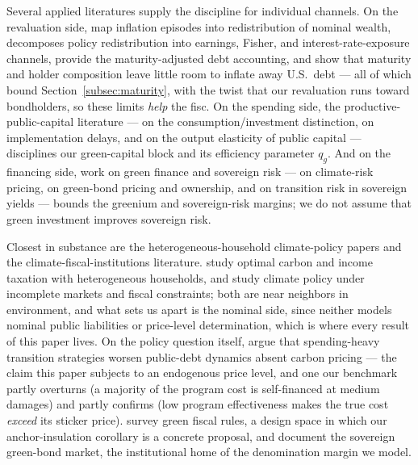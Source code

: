 \documentclass[12pt]{article}
\begin{document}
Several applied literatures supply the discipline for individual channels. On
the revaluation side, \citet{doepkeschneider2006} map inflation episodes into
redistribution of nominal wealth, \citet{auclert2019} decomposes policy
redistribution into earnings, Fisher, and interest-rate-exposure channels,
\citet{hallsargent2011} provide the maturity-adjusted debt accounting, and
\citet{hilscher2022} show that maturity and holder composition leave little
room to inflate away U.S.\ debt --- all of which bound
Section~\ref{subsec:maturity}, with the twist that our revaluation runs toward
bondholders, so these limits \emph{help} the fisc. On the spending side, the
productive-public-capital literature --- \citet{baxterking1993} on the
consumption/investment distinction, \citet{leeperwalkeryang2010} on
implementation delays, and \citet{bomligthart2014} on the output elasticity of
public capital --- disciplines our green-capital block and its efficiency
parameter $q_g$. And on the financing side, work on green finance and sovereign
risk --- \citet{gigliokellystroebel2021} on climate-risk pricing,
\citet{bakergreenbonds} on green-bond pricing and ownership, and
\citet{bis2025sovereign} on transition risk in sovereign yields --- bounds the
greenium and sovereign-risk margins; we do not assume that green investment
improves sovereign risk.

Closest in substance are the heterogeneous-household climate-policy papers and
the climate-fiscal-institutions literature. \citet{douennehummelpedroni} study
optimal carbon and income taxation with heterogeneous households, and
\citet{ddhp} study climate policy under incomplete markets and fiscal
constraints; both are near neighbors in environment, and what sets us apart is
the nominal side, since neither models nominal public liabilities or
price-level determination, which is where every result of this paper lives. On
the policy question itself, \citet{imf2024climatedebt} argue that spending-heavy
transition strategies worsen public-debt dynamics absent carbon pricing --- the
claim this paper subjects to an endogenous price level, and one our benchmark
partly overturns (a majority of the program cost is self-financed at medium
damages) and partly confirms (low program effectiveness makes the true cost
\emph{exceed} its sticker price). \citet{caselli2024greenfiscalrules} survey
green fiscal rules, a design space in which our anchor-insulation corollary is a
concrete proposal, and \citet{ando2022sovereignclimate} document the sovereign
green-bond market, the institutional home of the denomination margin we model.
\end{document}
